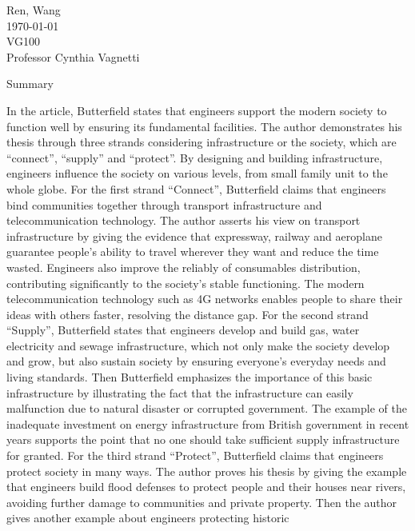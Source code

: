 \documentclass[12pt,a4]{article}
\begin{document}
\begin{flushleft}
Ren, Wang\\
\today\\
VG100\\
Professor Cynthia Vagnetti \\
\end{flushleft}

\begin{center}
Summary
\end{center}


In the article, Butterfield \cite{but} states that engineers support the modern
society to function well by ensuring its fundamental facilities. 
The author demonstrates his thesis through three strands considering
infrastructure or the society, which are ``connect'', ``supply'' and
``protect''. 
By designing and building infrastructure, engineers influence the society on
various levels, from small family unit to the whole globe.  
%
%
For the first strand ``Connect'', Butterfield claims that engineers bind
communities together through transport infrastructure and telecommunication
technology.
The author asserts his view on transport infrastructure by giving the evidence
that expressway, railway and aeroplane guarantee people's ability to travel
wherever they want and reduce the time wasted.
Engineers also improve the reliably of consumables distribution, contributing
significantly to the society's stable functioning. 
The modern telecommunication technology such as 4G networks enables people to
share their ideas with others faster, resolving the distance gap.
%
%
For the second strand ``Supply'', Butterfield states that engineers develop and
build gas, water electricity and sewage infrastructure, which not only make the
society develop and grow, but also sustain society by ensuring everyone's
everyday needs and living standards.
Then Butterfield emphasizes the importance of this basic infrastructure by
illustrating the fact that the infrastructure can easily malfunction due to
natural disaster or corrupted government.
The example of the inadequate investment on energy infrastructure from British
government in recent years supports the point that no one should take sufficient
supply infrastructure for granted.
%
%
For the third strand ``Protect'', Butterfield claims that engineers protect
society in many ways.
The author proves his thesis by giving the example that engineers build flood
defenses to protect people and their houses near rivers, avoiding further damage
to communities and private property.
Then the author gives another example about engineers protecting historic
\end{document}

